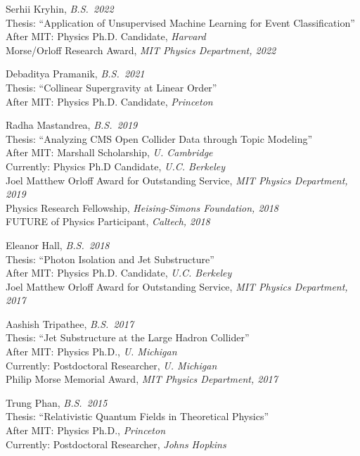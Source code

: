 \bbl

\item Serhii Kryhin, \emph{B.S.~2022}
\\ Thesis: ``Application of Unsupervised Machine Learning for Event Classification''
\\ After MIT: Physics Ph.D. Candidate, \emph{Harvard}
\\ Morse/Orloff Research Award, \emph{MIT Physics Department, 2022}

\item Debaditya Pramanik, \emph{B.S.~2021}
\\ Thesis: ``Collinear Supergravity at Linear Order''
\\ After MIT: Physics Ph.D. Candidate, \emph{Princeton}

\item Radha Mastandrea, \emph{B.S.~2019}
\\ Thesis: ``Analyzing CMS Open Collider Data through Topic Modeling''
\\ After MIT: Marshall Scholarship, \emph{U. Cambridge}
\\ Currently: Physics Ph.D Candidate, \emph{U.C. Berkeley}
\\ Joel Matthew Orloff Award for Outstanding Service, \emph{MIT Physics Department, 2019}
\\ Physics Research Fellowship, \emph{Heising-Simons Foundation, 2018}
\\ FUTURE of Physics Participant, \emph{Caltech, 2018}

\item Eleanor Hall, \emph{B.S.~2018}
\\ Thesis: ``Photon Isolation and Jet Substructure''
\\ After MIT: Physics Ph.D. Candidate, \emph{U.C. Berkeley}
\\ Joel Matthew Orloff Award for Outstanding Service, \emph{MIT Physics Department, 2017}

\item Aashish Tripathee, \emph{B.S.~2017}
\\ Thesis: ``Jet Substructure at the Large Hadron Collider''
\\ After MIT: Physics Ph.D., \emph{U. Michigan}
\\ Currently: Postdoctoral Researcher, \emph{U. Michigan}
\\ Philip Morse Memorial Award, \emph{MIT Physics Department, 2017}

\item Trung Phan, \emph{B.S.~2015}
\\ Thesis: ``Relativistic Quantum Fields in Theoretical Physics''
\\ After MIT: Physics Ph.D., \emph{Princeton}
\\ Currently: Postdoctoral Researcher, \emph{Johns Hopkins}

